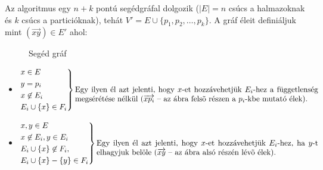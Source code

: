 Az algoritmus egy $n+k$ pontú segédgráfal dolgozik ($|E|=n$ csúcs a halmazoknak
és $k$ csúcs a particióknak), tehát $V' = E \cup \{p_1, p_2, \ldots, p_k\}$. A
gráf éleit definiáljuk mint $(\overrightarrow{xy}) \in E'$ ahol:

\begin{figure}[htbp]
\caption{Segéd gráf}
\label{fig:MPP_graf}
\centering {} 
\end{figure}


\begin{itemize}
  \item  $\begin{rcases}
  x \in E \\
  y = p_i  \\
  x \not \in E_i\\
  E_i \cup  \{x\}  \in  F_i \end{rcases}
  \parbox[t]{11cm}{Egy ilyen él azt jelenti, hogy $x$-et hozzávehetjük $E_i$-hez
   a függetlenség megsérétése nélkül ($\overrightarrow{xp_i}$ -- az ábra felsõ
  részen a $p_i$-kbe mutató élek).}$
  \item $\begin{rcases}
  x,y \in E \\
  x \not\in E_i, y \in E_i\\
   E_i \cup \{x\} \not\in F_i,\\ 
   E_i \cup \{x\} - \{y\} \in F_i
  \end{rcases} \parbox[t]{10cm}{Egy ilyen él azt jelenti, hogy $x$-et
  hozzávehetjük $E_i$-hez, ha $y$-t elhagyjuk belöle ($\overrightarrow{xy}$ --
  az ábra alsó részén lévõ élek).}$
\end{itemize}

